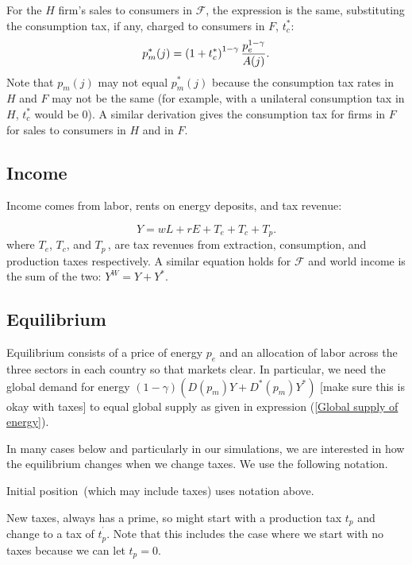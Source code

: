 \documentclass[notitlepage,12pt]{article}
\begin{document}
For the $H$ firm's sales to consumers in $\mathcal{F}$, the expression is
the same, substituting the consumption tax, if any, charged to consumers in $%
F$, $t_{c}^{\ast }$:%
\begin{equation*}
p_{m}^{\ast }(j)=\left( 1+t_{c}^{\ast }\right) ^{1-\gamma }\frac{%
p_{e}^{1-\gamma }}{A(j)}.
\end{equation*}%
Note that $p_{m}\left( j\right) $ may not equal $p_{m}^{\ast }\left(
j\right) $ because the consumption tax rates in $H$ and $F$ may not be the
same (for example, with a unilateral consumption tax in $H$, $t_{c}^{\ast }$
would be $0$). A similar derivation gives the consumption tax for firms in $F
$ for sales to consumers in $H$ and in $F$.

\subsection{Income}

Income comes from labor, rents on energy deposits, and tax revenue:

\begin{equation*}
Y=wL+rE+T_{e}+T_{c}+T_{p}.
\end{equation*}%
where $T_{e}$, $T_{c}$, and $T_{p}\,$, are tax revenues from extraction,
consumption, and production taxes respectively. A similar equation holds for 
$\mathcal{F}$ and world income is the sum of the two: $Y^{W}=Y+Y^{\ast }$.

\subsection{Equilibrium}

Equilibrium consists of a price of energy $p_{e}$ and an allocation of labor
across the three sectors in each country so that markets clear. In
particular, we need the global demand for energy $\left( 1-\gamma \right)
\left( D\left( p_{m}\right) Y+D^{\ast }\left( p_{m}\right) Y^{\ast }\right) $
[make sure this is okay with taxes] to equal global supply as given in
expression (\ref{Global supply of energy}).

In many cases below and particularly in our simulations, we are interested
in how the equilibrium changes when we change taxes. We use the following
notation.

Initial position\ (which may include taxes) uses notation above.

New taxes, always has a prime, so might start with a production tax $t_{p}$
and change to a tax of $t_{p}^{^{\prime }}$. Note that this includes the
case where we start with no taxes because we can let $t_{p}=0$. 
\end{document}
